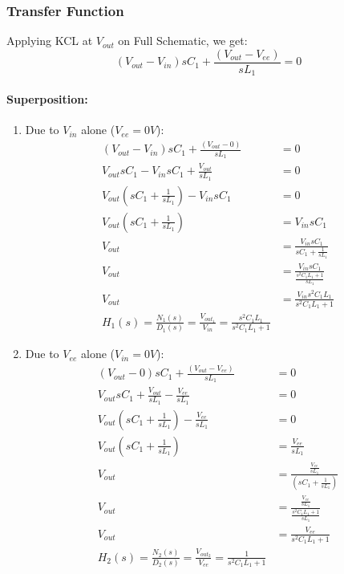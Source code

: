 \subsubsection{Transfer Function}
Applying KCL at $V_{out}$ on Full Schematic, we get:
\[
  (V_{out} - V_{in})sC_1 + \frac{(V_{out} - V_{ee})}{sL_1} = 0
\]
\paragraph{Superposition:}
\begin{enumerate}
  \item Due to \(V_{in}\) alone (\(V_{ee} = 0V\)):
    \begin{align*}
      (V_{out} - V_{in})sC_1 + \frac{(V_{out} - 0)}{sL_1} &= 0 \\
      V_{out}sC_1 - V_{in}sC_1 + \frac{V_{out}}{sL_1} &= 0 \\
      V_{out}(sC_1 + \frac{1}{sL_1}) - V_{in}sC_1 &= 0 \\
      V_{out}(sC_1 + \frac{1}{sL_1}) &= V_{in}sC_1 \\
      V_{out} &= \frac{V_{in}sC_1}{sC_1 + \frac{1}{sL_1}} \\
      V_{out} &= \frac{V_{in}sC_1}{\frac{s^2C_1L_1 + 1}{sL_1}} \\
      V_{out} &= \frac{V_{in}s^2C_1L_1}{s^2C_1L_1 + 1} \\
      \boxed{H_1(s) = \frac{N_1(s)}{D_1(s)} = \frac{V_{out_1}}{V_{in}} = \frac{s^2C_1L_1}{s^2C_1L_1 + 1}}
    \end{align*}
  \item Due to \(V_{ee}\) alone (\(V_{in} = 0V\)):
    \begin{align*}
      (V_{out} - 0)sC_1 + \frac{(V_{out} - V_{ee})}{sL_1} &= 0 \\
      V_{out}sC_1 + \frac{V_{out}}{sL_1} - \frac{V_{ee}}{sL_1} &= 0 \\
      V_{out}(sC_1 + \frac{1}{sL_1}) - \frac{V_{ee}}{sL_1} &= 0 \\
      V_{out}(sC_1 + \frac{1}{sL_1}) &= \frac{V_{ee}}{sL_1} \\
      V_{out} &= \frac{\frac{V_{ee}}{sL_1}}{(sC_1 + \frac{1}{sL_1})} \\
      V_{out} &= \frac{\frac{V_{ee}}{sL_1}}{\frac{s^2C_1L_1 + 1}{sL_1}} \\
      V_{out} &= \frac{V_{ee}}{s^2C_1L_1 + 1} \\
      \boxed{H_2(s) = \frac{N_2(s)}{D_2(s)} = \frac{V_{out_2}}{V_{ee}} = \frac{1}{s^2C_1L_1 + 1}}
    \end{align*}
\end{enumerate}
